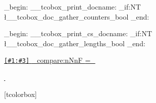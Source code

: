 \NewDocumentCommand {}
  {
    \group_begin:
    \textcolor{\kvtcb@col@counter} { \__tcobox_print_docname: }
      {
        \kvtcb@index@command{\kvtcb@doc@sortindex\idx@actual\tcbIndexPrintCountCA{\kvtcb@doc@index}}
        \bool_if:NT \l__tcobox_doc_gather_counters_bool
          {
            \kvtcb@index@command
              {
                \kvtcb@text@counters\idx@level\kvtcb@doc@sortindex\idx@actual
                \tcbIndexPrintCountC{\kvtcb@doc@index}
              }
          }
      }
    \group_end:
  }


\NewDocumentCommand {}
  {
    \group_begin:
    \textcolor{\kvtcb@col@length} { \__tcobox_print_cs_docname: }
      {
        \kvtcb@index@command{\kvtcb@doc@sortindex\idx@actual\tcbIndexPrintLenCA{\kvtcb@doc@index}}
        \bool_if:NT \l__tcobox_doc_gather_lengths_bool
          {
            \kvtcb@index@command
              {
                \kvtcb@text@lengths\idx@level\kvtcb@doc@sortindex\idx@actual
                \tcbIndexPrintLenC{\kvtcb@doc@index}
              }
          }
      }
    \group_end:
  }


\NewDocumentCommand {}
  {
    \hyperref[ {#1:#3} ]
      {
        \texttt{\ref* {#1:#3}}
          {
            \int_compare:nNnF {  } = { \thepage }
              {
                \kvtcb@doc@format@page
                  {
                    { \selectfont{} }
                    \,\kvtcb@text@pageshort\,
                    \pageref* {#1:#3}
                  }
              }
          }
      }
  }

\NewDocumentCommand {} {}
\NewDocumentCommand {} {}
\NewDocumentCommand {} {}
\NewDocumentCommand {} {}

\NewDocumentCommand {}
  {
    \href{ https://ctan.org/pkg/#1 }
    {
      \kvtcb@doc@format@page
        {
          { \selectfont{} }
          \,
        }
    }
  }

 [tcolorbox]
  {
    \ifHy@colorlinks
      \NewDocumentCommand {} { \textcolor{\kvtcb@colhyper} {} }
      \NewDocumentCommand {} { \textcolor{\kvtcb@colhyper} {} }
    \else
      \NewDocumentCommand {} {  }
      \NewDocumentCommand {} {  }
    \fi
  }

